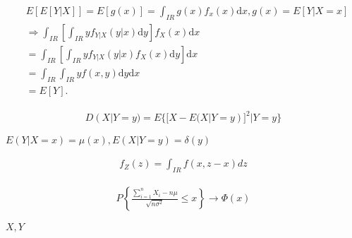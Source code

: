 
\usepackage[active,tightpage,auctex]{preview}

\setlength{\textwidth}{0.6\paperwidth}



\setlength\abovedisplayskip{0pt} %


\begin{preview}
\setcounter{equation}{0}%
\begin{align}
  &E[E[Y|X]] =E[g(x)] = \int_{IR} g(x) f_x(x) \mathrm{d} x, g(x) = E[Y|X=x]\\
  &\Rightarrow \int_{IR}[\int_{IR} y f_{Y|X}(y|x) \mathrm{d}y] f_X(x)\mathrm{d}x\\
  &=\int_{IR}[\int_{IR}yf_{Y|X}(y|x)f_X(x)\mathrm{d}y]\mathrm{d}x\\
  &=\int_{IR}\int_{IR} yf(x, y)\mathrm{d}y \mathrm{d}x\\
  &=E[Y].
\end{align}

\end{preview}

\begin{preview}
\setcounter{equation}{0}%
\begin{align}
  D(X|Y = y) = E\{[X - E(X|Y=y)]^2|Y=y\}
\end{align}

\end{preview}

\begin{preview}
\setcounter{equation}{0}%
\(E(Y|X=x) = \mu(x), E(X|Y=y) = \delta(y)\)
\end{preview}

\begin{preview}
\setcounter{equation}{0}%
\begin{align}
f_Z(z) = \int_{IR}f(x, z-x)dz
\end{align}

\end{preview}

\begin{preview}
\setcounter{equation}{0}%
\begin{align}
P\left\{\frac{\sum^n_{i=1} X_i - n\mu}{\sqrt{n\sigma^2}}\leq x \right\} \rightarrow \Phi(x)
\end{align}

\end{preview}

\begin{preview}
\setcounter{equation}{0}%
\(X, Y\)
\end{preview}

